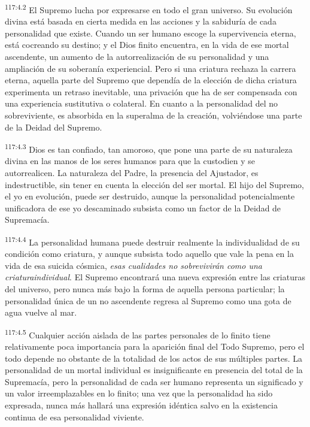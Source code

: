 \documentclass[twoside, 11pt]{book}
\begin{document}
\par
\textsuperscript{117:4.2} El Supremo lucha por expresarse en todo el gran universo. Su evolución divina está basada en cierta medida en las acciones y la sabiduría de cada personalidad que existe. Cuando un ser humano escoge la supervivencia eterna, está cocreando su destino; y el Dios finito encuentra, en la vida de ese mortal ascendente, un aumento de la autorrealización de su personalidad y una ampliación de su soberanía experiencial. Pero si una criatura rechaza la carrera eterna, aquella parte del Supremo que dependía de la elección de dicha criatura experimenta un retraso inevitable, una privación que ha de ser compensada con una experiencia sustitutiva o colateral. En cuanto a la personalidad del no sobreviviente, es absorbida en la superalma de la creación, volviéndose una parte de la Deidad del Supremo.

\par
\textsuperscript{117:4.3} Dios es tan confiado, tan amoroso, que pone una parte de su naturaleza divina en las manos de los seres humanos para que la custodien y se autorrealicen. La naturaleza del Padre, la presencia del Ajustador, es indestructible, sin tener en cuenta la elección del ser mortal. El hijo del Supremo, el yo en evolución, puede ser destruido, aunque la personalidad potencialmente unificadora de ese yo descaminado subsista como un factor de la Deidad de Supremacía.

\par
\textsuperscript{117:4.4} La personalidad humana puede destruir realmente la individualidad de su condición como criatura, y aunque subsista todo aquello que vale la pena en la vida de esa suicida cósmica, \textit{esas cualidades no sobrevivirán como una criaturaindividual}. El Supremo encontrará una nueva expresión entre las criaturas del universo, pero nunca más bajo la forma de aquella persona particular; la personalidad única de un no ascendente regresa al Supremo como una gota de agua vuelve al mar.

\par
\textsuperscript{117:4.5} Cualquier acción aislada de las partes personales de lo finito tiene relativamente poca importancia para la aparición final del Todo Supremo, pero el todo depende no obstante de la totalidad de los actos de sus múltiples partes. La personalidad de un mortal individual es insignificante en presencia del total de la Supremacía, pero la personalidad de cada ser humano representa un significado y un valor irreemplazables en lo finito; una vez que la personalidad ha sido expresada, nunca más hallará una expresión idéntica salvo en la existencia continua de esa personalidad viviente.
\end{document}
